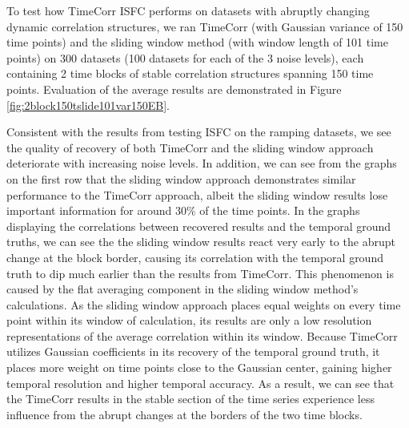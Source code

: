 \documentclass[11pt]{article}
\begin{document}
To test how TimeCorr ISFC performs on datasets with abruptly changing dynamic correlation structures, we ran TimeCorr (with Gaussian variance of 150 time points) and the sliding window method (with window length of 101 time points) on 300 datasets (100 datasets for each of the 3 noise levels), each containing 2 time blocks of stable correlation structures spanning 150 time points. Evaluation of the average results are demonstrated in Figure \ref{fig:2block150tslide101var150EB}.

Consistent with the results from testing ISFC on the ramping datasets, we see the quality of recovery of both TimeCorr and the sliding window approach deteriorate with increasing noise levels. In addition, we can see from the graphs on the first row that the sliding window approach demonstrates similar performance to the TimeCorr approach, albeit the sliding window results lose important information for around $30\%$ of the time points. In the graphs displaying the correlations between recovered results and the temporal ground truths, we can see the the sliding window results react very early to the abrupt change at the block border, causing its correlation with the temporal ground truth to dip much earlier than the results from TimeCorr. This phenomenon is caused by the flat averaging component in the sliding window method's calculations. As the sliding window approach places equal weights on every time point within its window of calculation, its results are only a low resolution representations of the average correlation within its window. Because TimeCorr utilizes Gaussian coefficients in its recovery of the temporal ground truth, it places more weight on time points close to the Gaussian center, gaining higher temporal resolution and higher temporal accuracy. As a result, we can see that the TimeCorr results in the stable section of the time series experience less influence from the abrupt changes at the borders of the two time blocks.
\end{document}
